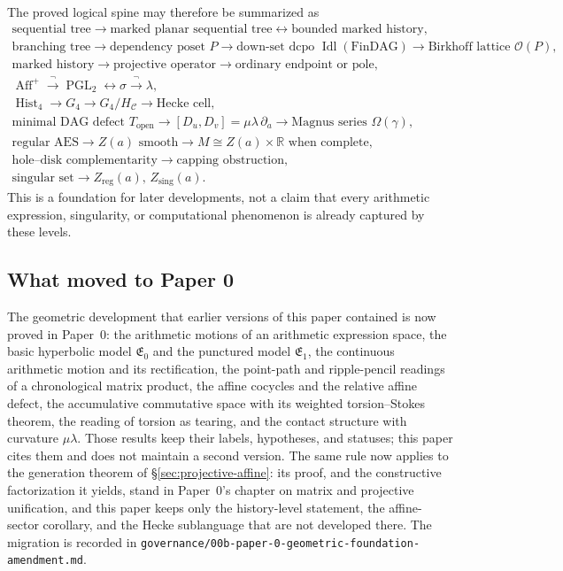 The proved logical spine may therefore be summarized as
\[
\begin{gathered}
    \text{sequential tree}
      \longrightarrow \text{marked planar sequential tree}
      \longleftrightarrow \text{bounded marked history},\\
    \text{branching tree}
      \longrightarrow \text{dependency poset } P
      \longrightarrow \text{down-set dcpo } \operatorname{Idl}(\mathrm{FinDAG})
      \longrightarrow \text{Birkhoff lattice } \mathcal O(P),\\
    \text{marked history}
      \longrightarrow \text{projective operator}
      \longrightarrow \text{ordinary endpoint or pole},\\
    \operatorname{Aff}^+
      \xrightarrow{\ \neg\ } \operatorname{PGL}_2
      \longleftrightarrow
    \sigma \xrightarrow{\ \neg\ } \lambda,\\
    \operatorname{Hist}_4
      \longrightarrow G_4
      \longrightarrow G_4/H_{\mathcal C}
      \longrightarrow \text{Hecke cell},\\
    \text{minimal DAG defect } T_{\mathrm{open}}
      \longrightarrow [D_u,D_v]=\mu\lambda\,\partial_a
      \longrightarrow \text{Magnus series } \Omega(\gamma),\\
    \text{regular AES}
      \longrightarrow Z(a)\text{ smooth}
      \longrightarrow M\cong Z(a)\times\mathbb R \text{ when complete},\\
    \text{hole--disk complementarity}
      \longrightarrow \text{capping obstruction},\\
    \text{singular set} \longrightarrow Z_{\mathrm{reg}}(a),\,Z_{\mathrm{sing}}(a).
\end{gathered}
\]
This is a foundation for later developments, not a claim that every arithmetic
expression, singularity, or computational phenomenon is already captured by
these levels.

\subsection{What moved to Paper 0}

The geometric development that earlier versions of this paper contained is now
proved in Paper~0: the arithmetic motions of an arithmetic expression space, the
basic hyperbolic model $\mathfrak E_0$ and the punctured model
$\mathfrak E_1$, the continuous arithmetic motion and its rectification, the
point-path and ripple-pencil readings of a chronological matrix product, the
affine cocycles and the relative affine defect, the accumulative commutative
space with its weighted torsion--Stokes theorem, the reading of torsion as
tearing, and the contact structure with curvature $\mu\lambda$.  Those results
keep their labels, hypotheses, and statuses; this paper cites them and does not
maintain a second version.  The same rule now applies to the generation theorem
of \S\ref{sec:projective-affine}: its proof, and the constructive factorization
it yields, stand in Paper~0's chapter on matrix and projective unification, and
this paper keeps only the history-level statement, the affine-sector corollary,
and the Hecke sublanguage that are not developed there.  The migration is recorded in
\texttt{governance/00b-paper-0-geometric-foundation-amendment.md}.


